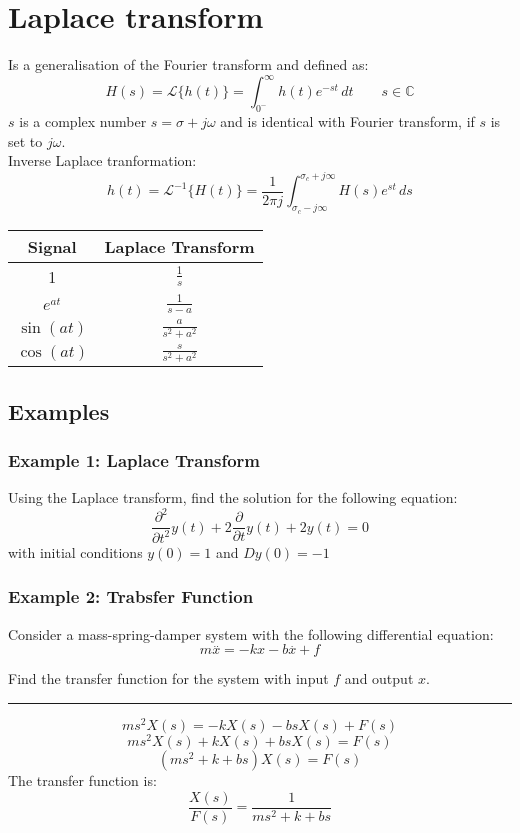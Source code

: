 \section{Laplace transform}
Is a generalisation of the Fourier transform and defined as:
$$H(s)=\mathcal{L}\{h(t)\}=\int_{0^-}^{\infty}h(t)e^{ -st }  \, dt \quad\quad s \in\mathbb{C}$$
$s$ is a complex number $s=\sigma+j\omega$ and is identical with Fourier transform, if $s$ is set to $j\omega$.\\
Inverse Laplace tranformation:
$$h(t)=\mathcal{L}^{-1}\{H(t)\}=\frac{1}{2\pi j}\int_{\sigma_{c}-j\infty}^{\sigma_{c}+j\infty} H(s)e^{ st } \, ds $$
\begin{table}[h]
\centering
\begin{tabular}{|c|c|}
\hline
\cellcolor[HTML]{C0C0C0} \textbf{Signal}& \cellcolor[HTML]{C0C0C0}\textbf{Laplace Transform}  \\ \hline
1&$\frac{1}{s}$ \\ \hline
$e^{at}$& $\frac{1}{s-a}$ \\ \hline
$\sin(at)$&$\frac{a}{s^2+a^2}$ \\ \hline
$\cos(at)$&$\frac{s}{s^2+a^2}$ \\ \hline
\end{tabular}
\end{table}
\subsection{Examples}
\subsubsection{Example 1: Laplace Transform}
Using the Laplace transform, find the solution for the following equation:
$$\frac{\partial^{2}}{\partial t^{2}}y(t)+2\frac{\partial}{\partial t}y(t)+2y(t)=0$$
with initial conditions $y (0) = 1$ and $Dy (0) = -1$
\subsubsection{Example 2: Trabsfer Function}
Consider a mass-spring-damper system with the following differential equation:
$$m\overset{..}{x}=-kx-b\overset{.}{x}+f$$

Find the transfer function for the system with input $f$ and output $x$.

\noindent\rule{\textwidth}{1pt}

$$ms^2X(s)=-kX(s)-bsX(s)+F(s)$$
$$ms^2X(s)+kX(s)+bsX(s)=F(s)$$
$$(ms^2+k+bs)X(s)=F(s)$$
The transfer function is:
$$\frac{X(s)}{F(s)}=\displaystyle\frac{1}{ms^2+k+bs}$$
